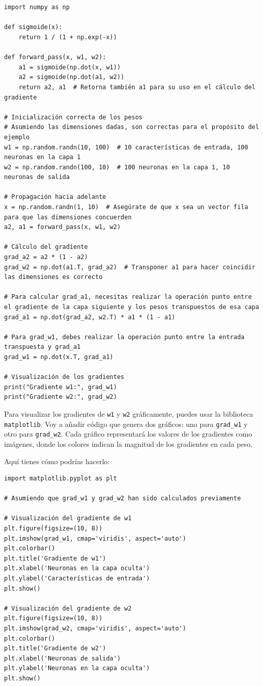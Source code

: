 \documentclass[11pt]{article}
\begin{document}
\begin{verbatim}


import numpy as np

def sigmoide(x):
    return 1 / (1 + np.exp(-x))

def forward_pass(x, w1, w2):
    a1 = sigmoide(np.dot(x, w1))
    a2 = sigmoide(np.dot(a1, w2))
    return a2, a1  # Retorna también a1 para su uso en el cálculo del gradiente

# Inicialización correcta de los pesos
# Asumiendo las dimensiones dadas, son correctas para el propósito del ejemplo
w1 = np.random.randn(10, 100)  # 10 características de entrada, 100 neuronas en la capa 1
w2 = np.random.randn(100, 10)  # 100 neuronas en la capa 1, 10 neuronas de salida

# Propagación hacia adelante
x = np.random.randn(1, 10)  # Asegúrate de que x sea un vector fila para que las dimensiones concuerden
a2, a1 = forward_pass(x, w1, w2)

# Cálculo del gradiente
grad_a2 = a2 * (1 - a2)
grad_w2 = np.dot(a1.T, grad_a2)  # Transponer a1 para hacer coincidir las dimensiones es correcto

# Para calcular grad_a1, necesitas realizar la operación punto entre el gradiente de la capa siguiente y los pesos transpuestos de esa capa
grad_a1 = np.dot(grad_a2, w2.T) * a1 * (1 - a1)

# Para grad_w1, debes realizar la operación punto entre la entrada transpuesta y grad_a1
grad_w1 = np.dot(x.T, grad_a1)

# Visualización de los gradientes
print("Gradiente w1:", grad_w1)
print("Gradiente w2:", grad_w2)
\end{verbatim}

Para visualizar los gradientes de \texttt{w1} y \texttt{w2} gráficamente, puedes usar
la biblioteca \texttt{matplotlib}. Voy a añadir código que genera dos gráficos:
uno para \texttt{grad\_w1} y otro para \texttt{grad\_w2}. Cada gráfico representará los
valores de los gradientes como imágenes, donde los colores indican la
magnitud de los gradientes en cada peso.

Aquí tienes cómo podrías hacerlo:

\begin{verbatim}
import matplotlib.pyplot as plt

# Asumiendo que grad_w1 y grad_w2 han sido calculados previamente

# Visualización del gradiente de w1
plt.figure(figsize=(10, 8))
plt.imshow(grad_w1, cmap='viridis', aspect='auto')
plt.colorbar()
plt.title('Gradiente de w1')
plt.xlabel('Neuronas en la capa oculta')
plt.ylabel('Características de entrada')
plt.show()

# Visualización del gradiente de w2
plt.figure(figsize=(10, 8))
plt.imshow(grad_w2, cmap='viridis', aspect='auto')
plt.colorbar()
plt.title('Gradiente de w2')
plt.xlabel('Neuronas de salida')
plt.ylabel('Neuronas en la capa oculta')
plt.show()
\end{verbatim}
\end{document}
